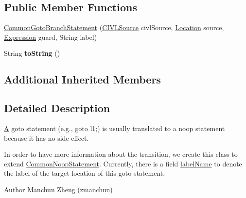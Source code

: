 \subsection*{Public Member Functions}
\begin{DoxyCompactItemize}
\item 
\hyperlink{classedu_1_1udel_1_1cis_1_1vsl_1_1civl_1_1model_1_1common_1_1statement_1_1CommonGotoBranchStatement_a38d6e4e9f4c3350b4d71ee4e9792facd}{Common\+Goto\+Branch\+Statement} (\hyperlink{interfaceedu_1_1udel_1_1cis_1_1vsl_1_1civl_1_1model_1_1IF_1_1CIVLSource}{C\+I\+V\+L\+Source} civl\+Source, \hyperlink{interfaceedu_1_1udel_1_1cis_1_1vsl_1_1civl_1_1model_1_1IF_1_1location_1_1Location}{Location} source, \hyperlink{interfaceedu_1_1udel_1_1cis_1_1vsl_1_1civl_1_1model_1_1IF_1_1expression_1_1Expression}{Expression} guard, String label)
\item 
\hypertarget{classedu_1_1udel_1_1cis_1_1vsl_1_1civl_1_1model_1_1common_1_1statement_1_1CommonGotoBranchStatement_aa7fddf806c7211715fa73e06a6dcf2ec}{}String {\bfseries to\+String} ()\label{classedu_1_1udel_1_1cis_1_1vsl_1_1civl_1_1model_1_1common_1_1statement_1_1CommonGotoBranchStatement_aa7fddf806c7211715fa73e06a6dcf2ec}

\end{DoxyCompactItemize}
\subsection*{Additional Inherited Members}


\subsection{Detailed Description}
\hyperlink{structA}{A} goto statement (e.\+g., {\ttfamily goto l1;}) is usually translated to a noop statement because it has no side-\/effect. 

In order to have more information about the transition, we create this class to extend \hyperlink{classedu_1_1udel_1_1cis_1_1vsl_1_1civl_1_1model_1_1common_1_1statement_1_1CommonNoopStatement}{Common\+Noop\+Statement}. Currently, there is a field \hyperlink{}{label\+Name} to denote the label of the target location of this goto statement.

\begin{DoxyAuthor}{Author}
Manchun Zheng (zmanchun) 
\end{DoxyAuthor}


